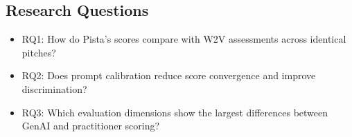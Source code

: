 \subsection{Research Questions}
\begin{itemize}
  \item RQ1: How do Pista’s scores compare with W2V assessments across identical pitches?
  \item RQ2: Does prompt calibration reduce score convergence and improve discrimination?
  \item RQ3: Which evaluation dimensions show the largest differences between GenAI and practitioner scoring?
\end{itemize}

